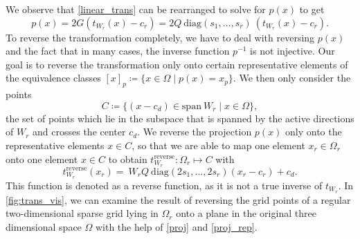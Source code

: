 \documentclass[
  a4paper,  %
  twoside,  %
  bibliography=totoc,
  headsepline,
  cleardoublepage=empty,
  parskip=half,
  draft=false
]{scrbook}
\begin{document}
We observe that \cref{linear_trans} can be rearranged to solve for $p(x)$ to get
\begin{equation}
p(x)=2 G (t_{W_r}(x) - c_r)=2 Q ~ \text{diag}(s_1, \dots, s_r) ~ (t_{W_r}(x) - c_r).
\label{proj}
\end{equation}
To reverse the transformation completely, we have to deal with reversing $p(x)$ and the fact that in many cases, the inverse function $p^{-1}$ is not injective.
Our goal is to reverse the transformation only onto certain representative elements of the equivalence classes $[x]_p \coloneqq \{x \in \Omega \mid p(x)=x_{p}\}$.
We then only consider the points
\begin{equation}
C \coloneqq \{(x - c_d) \in \text{span} ~ W_r \mid x \in \Omega\},
\label{proj_rep}
\end{equation}
\ie the set of points which lie in the subspace that is spanned by the active directions of $W_r$ and crosses the center $c_d$.
We reverse the projection $p(x)$ only onto the representative elements $x \in C$, so that we are able to map one element $x_r \in \Omega_r$ onto one element $x \in C$ to obtain $t_{W_r}^{\text{reverse}}\colon \Omega_r \mapsto C$ with
\begin{equation}
t_{W_r}^{\text{reverse}}(x_r) = ~W_r Q ~ \text{diag}\left(2s_1, \dots, 2s_r\right) (x_r - c_r) + c_d.
\end{equation}
%
This function is denoted as a reverse function, as it is not a true inverse of $t_{W_r}$.
In \cref{fig:trans_vis}, we can examine the result of reversing the grid points of a regular two-dimensional sparse grid lying in $\Omega_r$ onto a plane in the original three dimensional space $\Omega$ with the help of \cref{proj} and \cref{proj_rep}.
\end{document}
